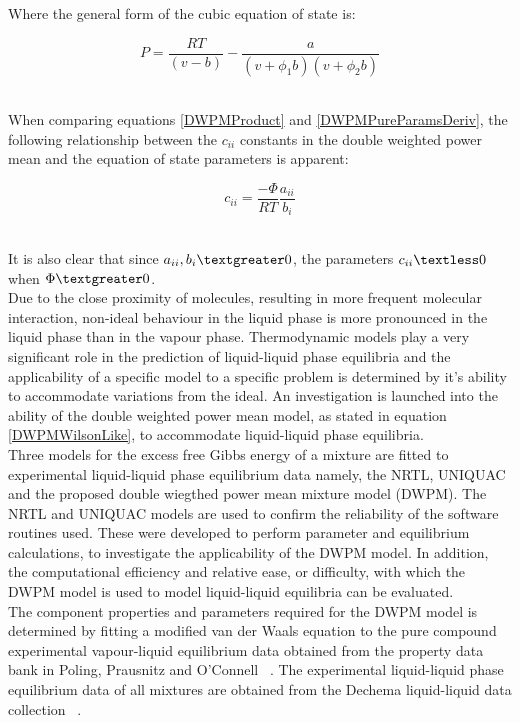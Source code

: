 Where the general form of the cubic equation of state is:\

\begin{equation}
  P = \frac{RT}{\left(v-b\right)} - \frac{a}{\left(v+\phi_{1}b\right)\left(v+\phi_{2}b\right)}
\end{equation}\

When comparing equations \ref{DWPMProduct} and \ref{DWPMPureParamsDeriv}, the following relationship between the $c_{ii}$ constants in the double weighted power mean and the equation of state parameters is apparent:\

\begin{equation}
  c_{ii} = \frac{-\Phi}{RT} \frac{a_{ii}}{b_{i}} \label{DWPMPureParam}
\end{equation}\

It is also clear that since $a_{ii}, b_{i} \textgreater 0$, the parameters $c_{ii}\textless 0$ when $\Phi\textgreater 0$.\\

Due to the close proximity of molecules, resulting in more frequent molecular interaction, non-ideal behaviour in the liquid phase is more pronounced in the liquid phase than in the vapour phase. Thermodynamic models play a very significant role in the prediction of liquid-liquid phase equilibria and the applicability of a specific model to a specific problem is determined by it's ability to accommodate variations from the ideal. An investigation is launched into the ability of the double weighted power mean model, as stated in equation \ref{DWPMWilsonLike}, to accommodate liquid-liquid phase equilibria.\\

Three models for the excess free Gibbs energy of a mixture are fitted to experimental liquid-liquid phase equilibrium data namely, the NRTL, UNIQUAC and the proposed double wiegthed power mean mixture model (DWPM). The NRTL and UNIQUAC models are used to confirm the reliability of the  software routines used. These were developed to perform parameter and equilibrium calculations, to investigate the applicability of the DWPM model. In addition, the computational efficiency and relative ease, or difficulty, with which the DWPM model is used to model liquid-liquid equilibria can be evaluated.\\
	
The component properties and parameters required for the DWPM model is determined by fitting a modified van der Waals equation to the pure 	compound experimental vapour-liquid equilibrium data obtained from the property data bank in Poling, Prausnitz and O'Connell ~\cite{GasLiquidProperties}. The experimental liquid-liquid phase equilibrium data of all mixtures are obtained from the Dechema liquid-liquid data collection ~\cite{Dechema}.\\
	

